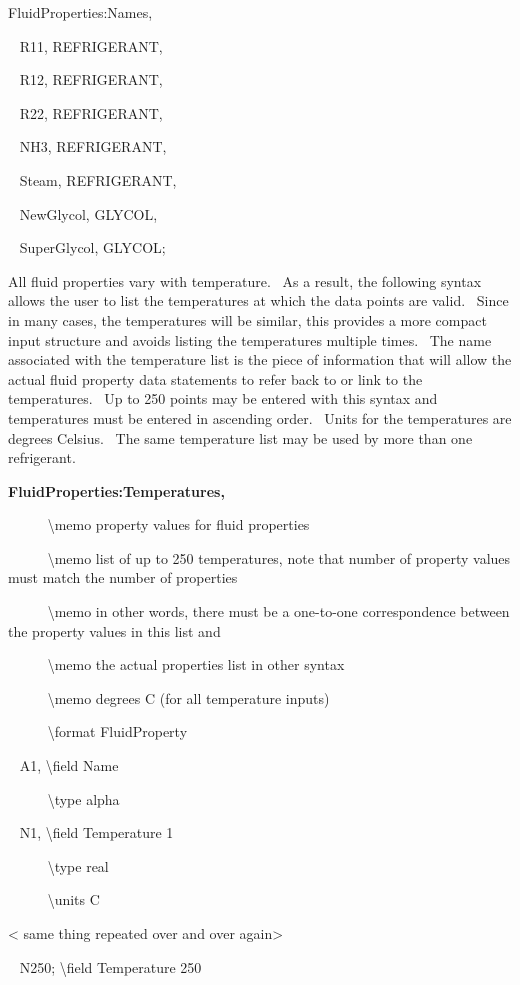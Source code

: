 FluidProperties:Names,

~ R11, REFRIGERANT,

~ R12, REFRIGERANT,

~ R22, REFRIGERANT,

~ NH3, REFRIGERANT,

~ Steam, REFRIGERANT,

~ NewGlycol, GLYCOL,

~ SuperGlycol, GLYCOL;

All fluid properties vary with temperature.~ As a result, the following syntax allows the user to list the temperatures at which the data points are valid.~ Since in many cases, the temperatures will be similar, this provides a more compact input structure and avoids listing the temperatures multiple times.~ The name associated with the temperature list is the piece of information that will allow the actual fluid property data statements to refer back to or link to the temperatures.~ Up to 250 points may be entered with this syntax and temperatures must be entered in ascending order.~ Units for the temperatures are degrees Celsius.~ The same temperature list may be used by more than one refrigerant.

\textbf{FluidProperties:Temperatures,}

~~~~~ \textbackslash{}memo property values for fluid properties

~~~~~ \textbackslash{}memo list of up to 250 temperatures, note that number of property values must match the number of properties

~~~~~ \textbackslash{}memo in other words, there must be a one-to-one correspondence between the property values in this list and

~~~~~ \textbackslash{}memo the actual properties list in other syntax

~~~~~ \textbackslash{}memo degrees C (for all temperature inputs)

~~~~~ \textbackslash{}format FluidProperty

~ A1, \textbackslash{}field Name

~~~~~ \textbackslash{}type alpha

~ N1, \textbackslash{}field Temperature 1

~~~~~ \textbackslash{}type real

~~~~~ \textbackslash{}units C

\textless{} same thing repeated over and over again\textgreater{}

~ N250; \textbackslash{}field Temperature 250

